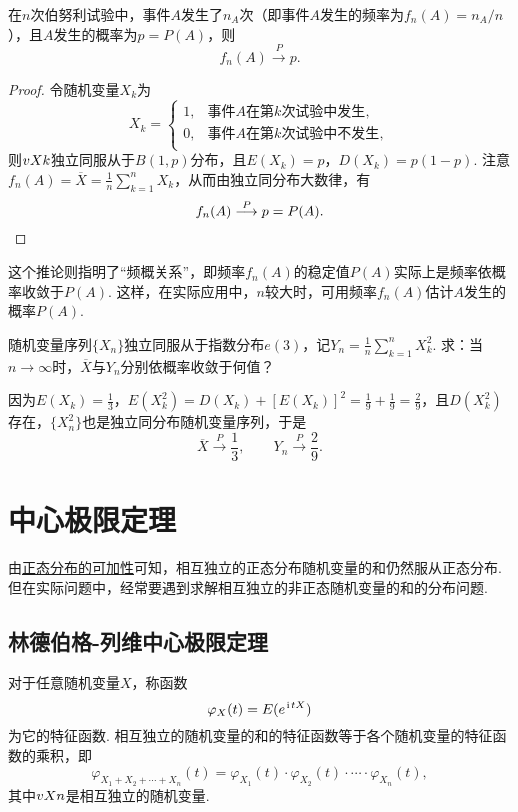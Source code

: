 \begin{corollary}[伯努利大数律]\label{theorem:极限定理.大数律.伯努利大数律}
在\(n\)次伯努利试验中，事件\(A\)发生了\(n_A\)次（即事件\(A\)发生的频率为\(f_n(A)=n_A / n\)），且\(A\)发生的概率为\(p=P(A)\)，则\[
f_n(A) \overset{P}{\longrightarrow} p.
\]
\begin{proof}
令随机变量\(X_k\)为\[
X_k = \left\{ \begin{array}{cl}
1, & \text{事件\(A\)在第\(k\)次试验中发生}, \\
0, & \text{事件\(A\)在第\(k\)次试验中不发生}, \\
\end{array} \right.
\]则\(v{X}{k}\)独立同服从于\(B(1,p)\)分布，且\(E(X_k)=p\)，\(D(X_k)=p(1-p)\).
注意\(f_n(A)=\overline{X}=\frac{1}{n} \sum\limits_{k=1}^n{X_k}\)，从而由独立同分布大数律，有\[
f_n(A) \overset{P}{\longrightarrow} p = P(A).
\qedhere
\]
\end{proof}
\end{corollary}
这个推论则指明了“频概关系”，即频率\(f_n(A)\)的稳定值\(P(A)\)实际上是频率依概率收敛于\(P(A)\).
这样，在实际应用中，\(n\)较大时，可用频率\(f_n(A)\)估计\(A\)发生的概率\(P(A)\).

\begin{example}
随机变量序列\(\{X_n\}\)独立同服从于指数分布\(e(3)\)，记\(Y_n = \frac{1}{n} \sum\limits_{k=1}^n X_k^2\).
求：当\(n\to\infty\)时，\(\overline{X}\)与\(Y_n\)分别依概率收敛于何值？
\begin{solution}
因为\(E(X_k) = \frac{1}{3}\)，\(E(X_k^2) = D(X_k) + [E(X_k)]^2 = \frac{1}{9} + \frac{1}{9} = \frac{2}{9}\)，且\(D(X_k^2)\)存在，\(\{X_n^2\}\)也是独立同分布随机变量序列，于是\[
\overline{X} \overset{P}{\longrightarrow} \frac{1}{3},
\qquad
Y_n \overset{P}{\longrightarrow} \frac{2}{9}.
\]
\end{solution}
\end{example}

\section{中心极限定理}
由\hyperref[theorem:正态分布与自然指数分布族.正态分布的可加性2]{正态分布的可加性}可知，相互独立的正态分布随机变量的和仍然服从正态分布.但在实际问题中，经常要遇到求解相互独立的非正态随机变量的和的分布问题.

\subsection{林德伯格-列维中心极限定理}
\begin{lemma}
对于任意随机变量\(X\)，称函数\[
\varphi_X(t) = E(e^{\kern1pt\mathrm{i}\kern1pt t X})
\]为它的特征函数.
相互独立的随机变量的和的特征函数等于各个随机变量的特征函数的乘积，即\[
\varphi_{X_1+X_2+\dotsb+X_n}(t)
= \varphi_{X_1}(t)
\cdot \varphi_{X_2}(t)
\cdot \dotsb
\cdot \varphi_{X_n}(t),
\]其中\(v{X}{n}\)是相互独立的随机变量.
\end{lemma}

